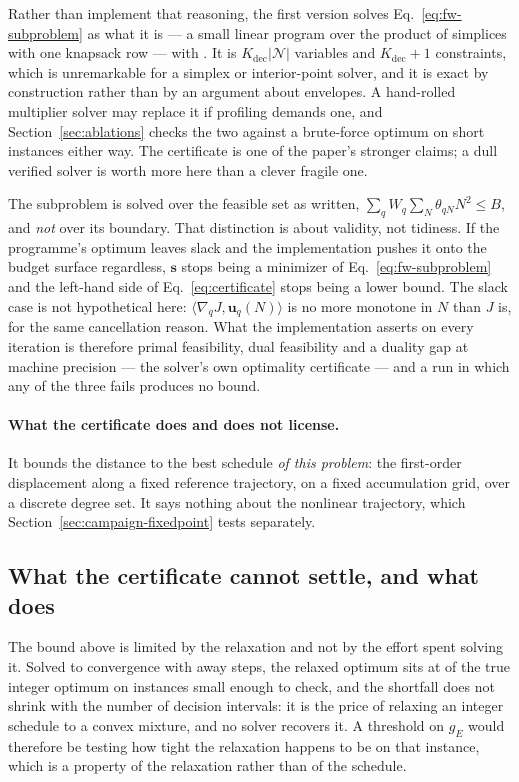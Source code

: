 Rather than implement that reasoning, the first version solves
Eq.~\eqref{eq:fw-subproblem} as what it is --- a small linear program over the
product of simplices with one knapsack row --- with
 \citep{virtanen2020scipy}. It is
$K_{\mathrm{dec}}\lvert\mathcal{N}\rvert$ variables and
$K_{\mathrm{dec}}{+}1$ constraints, which is unremarkable for a simplex or
interior-point solver, and it is exact by construction rather than by an
argument about envelopes. A hand-rolled multiplier solver may replace it if
profiling demands one, and Section~\ref{sec:ablations} checks the two against
a brute-force optimum on short instances either way. The certificate is one of
the paper's stronger claims; a dull verified solver is worth more here than a
clever fragile one.

The subproblem is solved over the feasible set as written,
$\sum_qW_q\sum_N\theta_{qN}N^2\le B$, and \emph{not} over its boundary. That
distinction is about validity, not tidiness. If the programme's optimum leaves
slack and the implementation pushes it onto the budget surface regardless,
$\mathbf s$ stops being a minimizer of Eq.~\eqref{eq:fw-subproblem} and the
left-hand side of Eq.~\eqref{eq:certificate} stops being a lower bound. The
slack case is not hypothetical here: $\langle\nabla_qJ,\mathbf u_q(N)\rangle$
is no more monotone in $N$ than $J$ is, for the same cancellation reason.
What the implementation asserts on every iteration is therefore primal
feasibility, dual feasibility and a duality gap at machine precision --- the
solver's own optimality certificate --- and a run in which any of the three
fails produces no bound.

\paragraph{What the certificate does and does not license.} It bounds the
distance to the best schedule \emph{of this problem}: the first-order
displacement along a fixed reference trajectory, on a fixed accumulation grid,
over a discrete degree set. It says nothing about the nonlinear trajectory,
which Section~\ref{sec:campaign-fixedpoint} tests separately.

\subsection{What the certificate cannot settle, and what does}
\label{sec:algorithm-exhaustive}

The bound above is limited by the relaxation and not by the effort spent
solving it. Solved to convergence with away steps, the relaxed optimum sits at
 of the true integer optimum on instances small enough to check, and
the shortfall does not shrink with the number of decision intervals: it is the
price of relaxing an integer schedule to a convex mixture, and no solver
recovers it. A threshold on $g_E$ would therefore be testing how tight the
relaxation happens to be on that instance, which is a property of the
relaxation rather than of the schedule.

